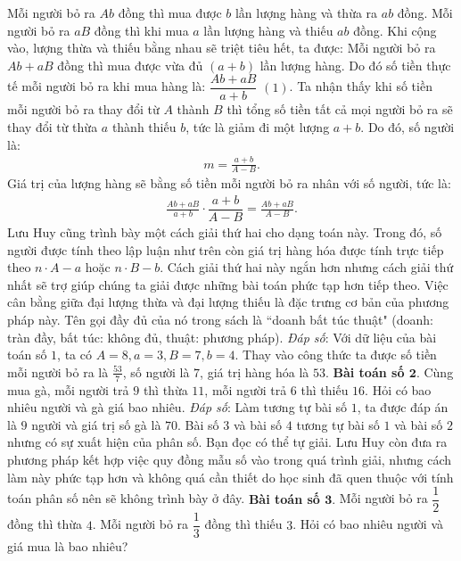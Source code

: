 \begin{multicols}{2}
	\vskip 0.1cm
	Mỗi người bỏ ra $Ab$ đồng thì mua được $b$ lần lượng hàng và thừa ra $ab$ đồng.
	\vskip 0.1cm
	Mỗi người bỏ ra $aB$ đồng thì khi mua $a$ lần lượng hàng và thiếu $ab$ đồng.
	\vskip 0.1cm
	Khi cộng vào, lượng thừa và thiếu bằng nhau sẽ triệt tiêu hết, ta được:
	\vskip 0.1cm
	Mỗi người bỏ ra $Ab+aB$ đồng thì mua được vừa đủ $(a+b)$ lần lượng hàng.
	\vskip 0.1cm
	Do đó số tiền thực tế mỗi người bỏ ra khi mua hàng là: $\dfrac{Ab + aB}{a + b}$ $(1)$.
	\vskip 0.1cm
	Ta nhận thấy khi số tiền mỗi người bỏ ra thay đổi từ $A$ thành $B$ thì tổng số tiền tất cả mọi người bỏ ra sẽ thay đổi từ thừa $a$ thành thiếu $b$, tức là giảm đi một lượng $a+b$. Do đó, số người là:
	\begin{align*}
		m = \frac{a + b}{A-B}.
	\end{align*}
	Giá trị của lượng hàng sẽ bằng số tiền mỗi người bỏ ra nhân với số người, tức là:
	\begin{align*}
		\frac{Ab+ aB}{a + b} \cdot \dfrac{a+b}{A-B}= \frac{Ab+ aB}{A-B}.
	\end{align*}
	Lưu Huy cũng trình bày một cách giải thứ hai cho dạng toán này. Trong đó, số người được tính theo lập luận như trên còn giá trị hàng hóa được tính trực tiếp theo $n \cdot A - a$ hoặc $n \cdot B - b$.
	\vskip 0.1cm
	Cách giải thứ hai này ngắn hơn nhưng cách giải thứ nhất sẽ trợ giúp chúng ta giải được những bài toán phức tạp hơn tiếp theo.
	\vskip 0.1cm
	Việc cân bằng giữa đại lượng thừa và đại lượng thiếu là đặc trưng cơ bản của phương pháp này. Tên gọi đầy đủ của nó trong sách là ``doanh bất túc thuật" (doanh: tràn đầy, bất túc: không đủ, thuật: phương pháp).
	\vskip 0.1cm
	\textit{Đáp số}: Với dữ liệu của bài toán số $1$, ta có $A=8,a=3,B=7,b=4$. Thay vào công thức ta được số tiền mỗi người bỏ ra là $\frac{53}{7}$, số người là $7$, giá trị hàng hóa là $53$.
	\vskip 0.1cm
	\textbf{\color{diendantoanhoc}Bài toán số $\pmb{2.}$} Cùng mua gà, mỗi người trả $9$ thì thừa $11$, mỗi người trả $6$ thì thiếu $16$. Hỏi có bao nhiêu người và gà giá bao nhiêu.
	\vskip 0.1cm
	\textit{Đáp số}: Làm tương tự bài số $1$, ta được đáp án là $9$ người và giá trị số gà là $70$.
	\vskip 0.1cm
	Bài số $3$ và bài số $4$ tương tự bài số $1$ và bài số $2$ nhưng có sự xuất hiện của phân số. Bạn đọc có thể tự giải. Lưu Huy còn đưa ra phương pháp kết hợp việc quy đồng mẫu số vào trong quá trình giải, nhưng cách làm này phức tạp hơn và không quá cần thiết do học sinh đã quen thuộc với tính toán phân số nên sẽ không trình bày ở đây.
	\vskip 0.1cm
	\textbf{\color{diendantoanhoc}Bài toán số $\pmb{3.}$} Mỗi người bỏ ra $\dfrac{1}{2}$ đồng thì thừa $4$. Mỗi người bỏ ra $\dfrac{1}{3}$ đồng thì thiếu $3$. Hỏi có bao nhiêu người và giá mua là bao nhiêu?

\end{multicols}
